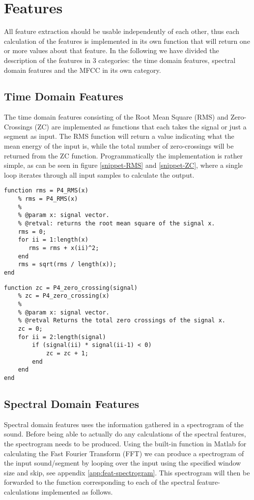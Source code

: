 \section{Features}
All feature extraction should be usable independently of each other, thus each calculation of the features is implemented in its own function that will return one or more values about that feature. In the following we have divided the description of the features in 3 categories: the time domain features, spectral domain features and the MFCC in its own category.

\subsection{Time Domain Features}
The time domain features consisting of the Root Mean Square (RMS) and Zero-Crossings (ZC) are implemented as functions that each takes the signal or just a segment as input. The RMS function will return a value indicating what the mean energy of the input is, while the total number of zero-crossings will be returned from the ZC function. Programmatically the implementation is rather simple, as can be seen in figure \ref{snippet-RMS} and \ref{snippet-ZC}, where a single loop iterates through all input samples to calculate the output.

\begin{lstlisting}[caption=Matlab implementation of the RMS algorithm., label=snippet-RMS]
function rms = P4_RMS(x)
    % rms = P4_RMS(x)
    %
    % @param x: signal vector.
    % @retval: returns the root mean square of the signal x.
    rms = 0;
    for ii = 1:length(x)
       rms = rms + x(ii)^2; 
    end
    rms = sqrt(rms / length(x));
end
\end{lstlisting}

\begin{lstlisting}[caption=Matlab implementation of the ZC algorithm., label=snippet-ZC]
function zc = P4_zero_crossing(signal)
    % zc = P4_zero_crossing(x)
    %
    % @param x: signal vector.
    % @retval Returns the total zero crossings of the signal x.
    zc = 0;
    for ii = 2:length(signal)
        if (signal(ii) * signal(ii-1) < 0)
            zc = zc + 1;
        end
    end
end
\end{lstlisting}

\subsection{Spectral Domain Features}
Spectral domain features uses the information gathered in a spectrogram of the sound. Before being able to actually do any calculations of the spectral features, the spectrogram needs to be produced. Using the built-in function in Matlab for calculating the Fast Fourier Transform (FFT) we can produce a spectrogram of the input sound/segment by looping over the input using the specified window size and skip, see appendix \ref{app:feat-spectrogram}. This spectrogram will then be forwarded to the function corresponding to each of the spectral feature-calculations implemented as follows.

